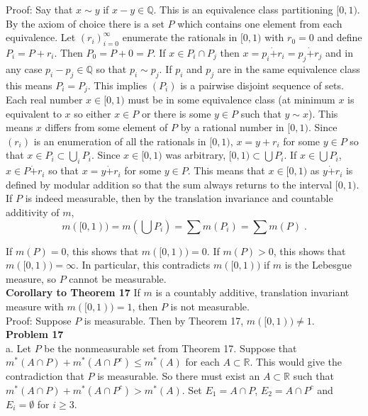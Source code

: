 \documentclass[a4paper]{article}
\begin{document}
Proof: Say that $x \sim y$ if $x - y \in \mathbb{Q}$. This is an equivalence class partitioning $[0,1)$. By the axiom of choice there is a set $P$ which contains one element from each equivalence. Let $(r_i)_{i=0}^\infty$ enumerate the rationals in $[0,1)$ with $r_0 = 0$ and define $P_i = P + r_i$. Then $P_0 = P + 0 = P$. If $x \in P_i\cap P_j$ then $x = p_i \dot{+} r_i = p_j \dot{+} r_j$ and in any case $p_i - p_j \in \mathbb{Q}$ so that $p_i \sim p_j$. If $p_i$ and $p_j$ are in the same equivalence class this means $P_i = P_j$. This implies $(P_i)$ is a pairwise disjoint sequence of sets. Each real number $x \in [0,1)$ must be in some equivalence class (at minimum $x$ is equivalent to $x$ so either $x \in P$ or there is some $y \in P$ such that $y \sim x$). This means $x$ differs from some element of $P$ by a rational number in $[0,1)$. Since $(r_i)$ is an enumeration of all the rationals in $[0,1)$, $x = y + r_i$ for some $y \in P$ so that $x \in P_i \subset \bigcup_{i} P_i$. Since $x \in [0,1)$ was arbitrary, $[0,1) \subset \bigcup P_i$. If $x \in \bigcup P_i$, $x \in P\dot{+} r_i$ so that $x = y \dot{+} r_i$ for some $y \in P$. This means that $x \in [0,1)$ as $y\dot{+} r_i$ is defined by modular addition so that the sum always returns to the interval $[0,1)$. If $P$ is indeed measurable, then by the translation invariance and countable additivity of $m$,
$$m([0,1)) = m\left(\bigcup P_i\right) = \sum m(P_i) = \sum m(P) \;.$$

If $m(P) = 0$, this shows that $m([0,1)) = 0$. If $m(P) > 0$, this shows that $m([0,1)) = \infty$. In particular, this contradicts $m([0,1))$ if $m$ is the Lebesgue measure, so $P$ cannot be measurable. \\

{\bf Corollary to Theorem 17} If $m$ is a countably additive, translation invariant measure with $m([0,1)) = 1$, then $P$ is not measurable. \\

Proof: Suppose $P$ is measurable. Then by Theorem 17, $m([0,1)) \neq 1$. \\



{\bf Problem 17}\\

a. Let $P$ be the nonmeasurable set from Theorem 17. Suppose that $m^*(A\cap P) + m^*(A \cap P^c) \leq m^*(A)$ for each $A \subset \mathbb{R}$. This would give the contradiction that $P$ is measurable. So there must exist an $A \subset \mathbb{R}$ such that $m^*(A \cap P) + m^*(A \cap P^c) > m^*(A)$. Set $E_1 = A\cap P$, $E_2 = A \cap P^c$ and $E_i = \emptyset$ for $i \geq 3$.
\end{document}
